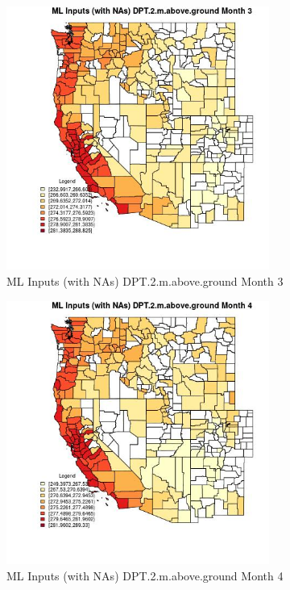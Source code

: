 \begin{figure} 
\centering  
\includegraphics[width=0.77\textwidth]{Code_Outputs/Report_ML_input_PM25_Step4_part_e_de_duplicated_aves_compiled_2019-05-21wNAs_CountyDPT2mabovegroundmedianMonth3.jpg} 
\caption{\label{fig:Report_ML_input_PM25_Step4_part_e_de_duplicated_aves_compiled_2019-05-21wNAsCountyDPT2mabovegroundmedianMonth3}ML Inputs (with NAs) DPT.2.m.above.ground Month 3} 
\end{figure} 
 

\begin{figure} 
\centering  
\includegraphics[width=0.77\textwidth]{Code_Outputs/Report_ML_input_PM25_Step4_part_e_de_duplicated_aves_compiled_2019-05-21wNAs_CountyDPT2mabovegroundmedianMonth4.jpg} 
\caption{\label{fig:Report_ML_input_PM25_Step4_part_e_de_duplicated_aves_compiled_2019-05-21wNAsCountyDPT2mabovegroundmedianMonth4}ML Inputs (with NAs) DPT.2.m.above.ground Month 4} 
\end{figure} 
 


